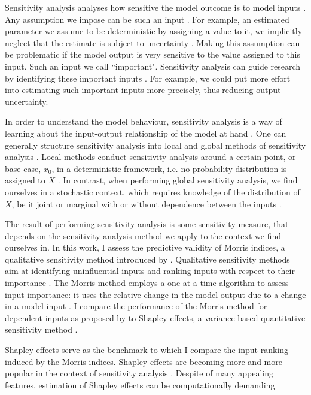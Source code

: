 Sensitivity analysis analyses how sensitive the model outcome is to model inputs \citep{R21}. Any assumption we impose can be such an input \citep{R21}. For example, an estimated parameter we assume to be deterministic by assigning a value to it, we implicitly neglect that the estimate is subject to uncertainty \citep{R21}. Making this assumption can be problematic if the model output is very sensitive to the value assigned to this input. Such an input we call ``important". Sensitivity analysis can guide research by identifying these important inputs \citep{R21}. For example, we could put more effort into estimating such important inputs more precisely, thus reducing output uncertainty.

In order to understand the model behaviour, sensitivity analysis is a way of learning about the input-output relationship of the model at hand \citep{BP16}. One can generally structure sensitivity analysis into local and global methods of sensitivity analysis \citep{BP16}. Local methods conduct sensitivity analysis around a certain point, or base case, $x_0$, in a deterministic framework, i.e. no probability distribution is assigned to $X$ \citep{BP16}. In contrast, when performing global sensitivity analysis, we find ourselves in a stochastic context, which requires knowledge of the distribution of $X$, be it joint or marginal with or without dependence between the inputs \citep{ST02}.

The result of performing sensitivity analysis is some sensitivity measure, that depends on the sensitivity analysis method we apply to the context we find ourselves in. In this work, I assess the predictive validity of Morris indices, a qualitative sensitivity method introduced by \citet{M91}. Qualitative sensitivity methods aim at identifying uninfluential inputs and ranking inputs with respect to their importance \citep{BP16}. The Morris method employs a one-at-a-time algorithm to assess input importance: it uses the relative change in the model output due to a change in a model input \citep{M91}. I compare the performance of the Morris method for dependent inputs as proposed by \citet{GM17} to Shapley effects, a variance-based quantitative sensitivity method \citep{O14}.

Shapley effects serve as the benchmark to which I compare the input ranking induced by the Morris indices. Shapley effects are becoming more and more popular in the context of sensitivity analysis \citep{PRB20}. Despite of many appealing features, estimation of  Shapley effects can be computationally demanding \citep{SNS16}

